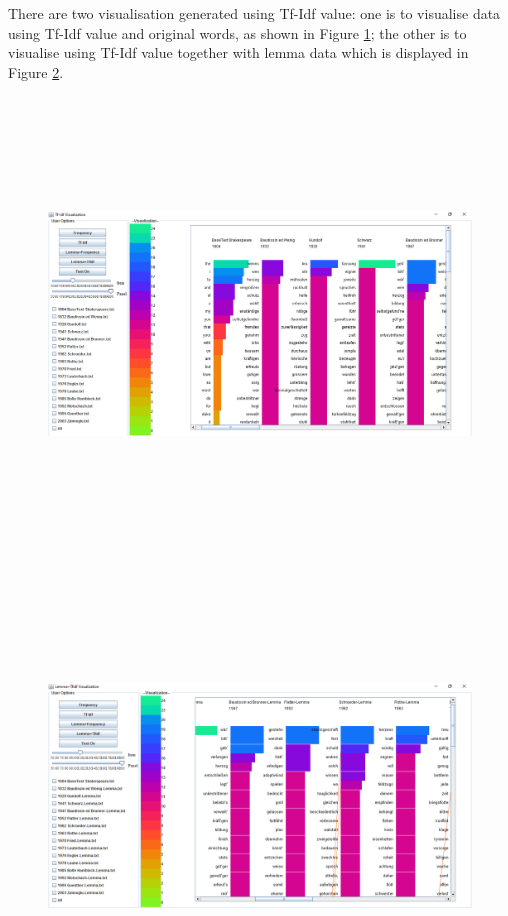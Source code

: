 There are two visualisation generated using Tf-Idf value: one is to visualise data using Tf-Idf value and original words, as shown in Figure \ref{fig:tfIdfView}; the other is to visualise using Tf-Idf value together with lemma data which is displayed in Figure \ref{fig:tfIdfLemma}.

\begin{figure}[h]
	\centering	
	\includegraphics[width=16cm, height=12cm]{Figs/Tf-Idf}\\[1ex]
	\caption{}
	\label{fig:tfIdfView}
\end{figure} 
\begin{figure}[h]
	\centering	
	\includegraphics[width=16cm, height=12cm]{Figs/Lemma-TfIdf}\\[1ex]
	\caption{}
	\label{fig:tfIdfLemma}
\end{figure} 


